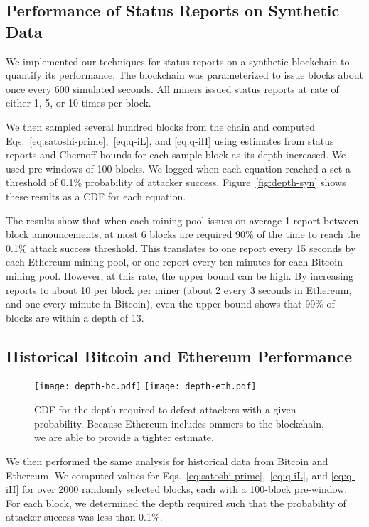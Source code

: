 \documentclass[10pt,sigconf]{acmart}
\newcommand{\1}{{\em (i)}}
\newcommand{\2}{{\em (ii)}}
\newcommand{\3}{{\em (iii)}}
\newcommand{\4}{{\em (iv)}}
\newcommand{\5}{{\em (v)}}
\begin{document}
\subsection{Performance of Status Reports on Synthetic Data}
We implemented our techniques for status reports on a synthetic blockchain to quantify its performance. The blockchain was parameterized to issue blocks about once every 600 simulated seconds. All miners issued status reports at rate of either 1, 5, or 10 times per block. 

 We then sampled several hundred blocks from the chain and computed Eqs.~\ref{eq:satoshi-prime},~\ref{eq:q-iL}, and  \ref{eq:q-iH} using estimates from status reports and Chernoff bounds for each sample block as its depth increased. We used pre-windows of 100 blocks. We logged  when each  equation reached a set a threshold of 0.1\% probability of attacker success.
Figure~\ref{fig:depth-syn} shows these results as a CDF for each equation. 

The results show that when each mining pool issues on average 1 report between block announcements, at most 6 blocks are required 90\% of the time to reach the 0.1\% attack success threshold. This translates to one report every 15 seconds by each Ethereum mining pool, or one report every ten minutes for each Bitcoin mining pool. However, at this rate, the upper bound can be high. By increasing reports to about 10 per block per miner (about 2 every 3 seconds in Ethereum, and one every minute in Bitcoin), even the upper bound shows that 99\% of blocks are within a depth of 13.

  
\subsection{Historical Bitcoin and Ethereum Performance}

 
\begin{figure}[t] 
   \centering
   \texttt{[image: depth-bc.pdf]}
   \texttt{[image: depth-eth.pdf]}
   \caption{CDF for the depth required to defeat attackers with a
     given probability. Because Ethereum includes ommers to the
     blockchain, we are able to provide a tighter estimate. }
   \label{fig:depth}
\end{figure}

We then performed the same analysis for historical data from Bitcoin and Ethereum. We computed values for Eqs.~\ref{eq:satoshi-prime},~\ref{eq:q-iL}, and  \ref{eq:q-iH} for over 2000 randomly selected blocks, each with a 100-block pre-window. For each block, we determined the depth required  such that the probability of attacker success was less than 0.1\%.  
\end{document}

